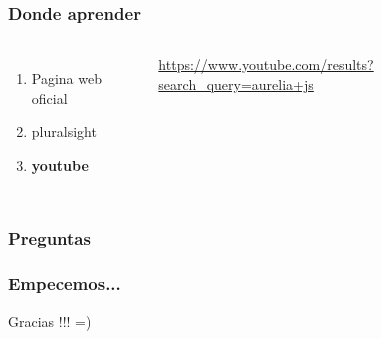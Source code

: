 \documentclass{beamer}
\begin{document}
\begin{frame}
\frametitle{Donde aprender}
\begin{columns}[c] %
\begin{enumerate}
\item Pagina web oficial
\item pluralsight
\item \textbf{youtube}
\end{enumerate}

{\color{blue}\url{https://www.youtube.com/results?search_query=aurelia+js}}
\end{columns}
\end{frame}
\begin{frame}
\frametitle{Preguntas}
\end{frame}
\begin{frame}
\frametitle{Empecemos...}
\begin{figure}
\end{figure}
\end{frame}
\begin{frame}
\Huge{\centerline{Gracias !!! =)}}
\end{frame}

\end{document}
